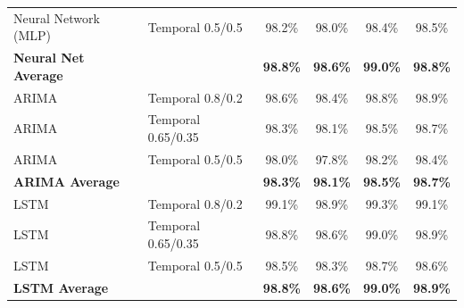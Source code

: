 \documentclass[11pt,a4paper]{article}
\begin{document}
\begin{table}[H]
\begin{tabular}{llcccc}
Neural Network (MLP) & Temporal 0.5/0.5 & 98.2\% & 98.0\% & 98.4\% & 98.5\% \\
\textbf{Neural Net Average} & & \textbf{98.8\%} & \textbf{98.6\%} & \textbf{99.0\%} & \textbf{98.8\%} \\
\midrule
ARIMA & Temporal 0.8/0.2 & 98.6\% & 98.4\% & 98.8\% & 98.9\% \\
ARIMA & Temporal 0.65/0.35 & 98.3\% & 98.1\% & 98.5\% & 98.7\% \\
ARIMA & Temporal 0.5/0.5 & 98.0\% & 97.8\% & 98.2\% & 98.4\% \\
\textbf{ARIMA Average} & & \textbf{98.3\%} & \textbf{98.1\%} & \textbf{98.5\%} & \textbf{98.7\%} \\
\midrule
LSTM & Temporal 0.8/0.2 & 99.1\% & 98.9\% & 99.3\% & 99.1\% \\
LSTM & Temporal 0.65/0.35 & 98.8\% & 98.6\% & 99.0\% & 98.9\% \\
LSTM & Temporal 0.5/0.5 & 98.5\% & 98.3\% & 98.7\% & 98.6\% \\
\textbf{LSTM Average} & & \textbf{98.8\%} & \textbf{98.6\%} & \textbf{99.0\%} & \textbf{98.9\%} \\
\bottomrule
\end{tabular}
\end{table}
\end{document}
